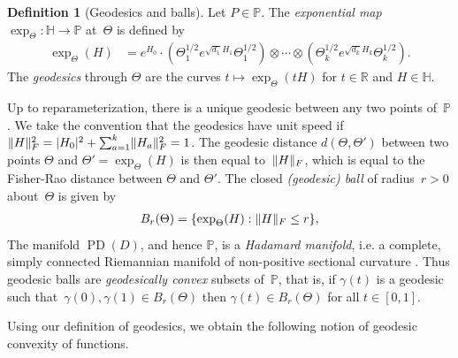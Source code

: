 \documentclass[aos]{imsart}
\theoremstyle{definition}
\newtheorem*{definition}{Definition}
\numberwithin{equation}{section}
\DeclareMathOperator{\PD}{PD}
\DeclarePairedDelimiter{\abs}{\lvert}{\rvert}
\DeclarePairedDelimiter{\norm}{\lVert}{\rVert}
\newcommand{\R}{{\mathbb{R}}}
\renewcommand{\P}{{\mathbb{P}}}
\renewcommand{\H}{{\mathbb{H}}}
\newcommand{\ot}{\otimes}
\begin{document}
\begin{definition}[Geodesics and balls]
Let $P\in\P$.
The \emph{exponential map} $\exp_\Theta \colon \H \to \P$ at~$\Theta$ is defined by
\begin{align*}
  \exp_\Theta(H) &= e^{H_0} \cdot ( \Theta_1^{1/2} e^{\sqrt{d_1} H_1} \Theta_1^{1/2}) \ot \cdots \ot (\Theta_k^{1/2} e^{\sqrt{d_k} H_k} \Theta_k^{1/2}).
\end{align*}
The \emph{geodesics} through $\Theta$ are the curves $t \mapsto \exp_\Theta(t H)$ for $t\in\R$ and $H\in\H$. 


Up to reparameterization, there is a unique geodesic between any two points of~$\P$.
We take the convention that the geodesics have unit speed if $\norm{H}_F^2 = \abs{H_0}^2 + \sum_{a=1}^k \norm{H_a}_F^2 = 1$.
The geodesic distance $d(\Theta,\Theta')$ between two points $\Theta$ and $\Theta'=\exp_\Theta(H)$ is then equal to~$\norm H_F$, which is equal to the Fisher-Rao distance between $\Theta$ and $\Theta'$. The closed \emph{(geodesic) ball} of radius~$r>0$ about~$\Theta$ is given by
\begin{align*}
  B_r(\Theta) = \{ \exp_\Theta(H) : \norm H_F \leq r \},
\end{align*}
The manifold $\PD(D)$, and hence $\P$, is a \emph{Hadamard manifold}, i.e. a complete, simply connected Riemannian manifold of non-positive sectional curvature \citep{bacak2014convex}. Thus geodesic balls are \emph{geodesically convex} subsets of~$\P$, that is, if $\gamma(t)$ is a geodesic such that~$\gamma(0),\gamma(1) \in B_r(\Theta)$ then $\gamma(t) \in B_r(\Theta)$ for all $t\in[0,1]$.
\end{definition}

Using our definition of geodesics, we obtain the following notion of geodesic convexity of functions.
\end{document}
